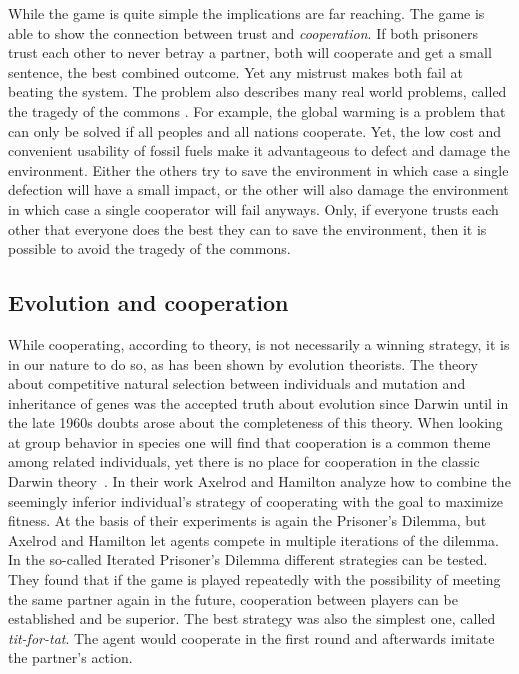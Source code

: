 While the game is quite simple the implications are far reaching. The game is able to show the 
connection between trust and \textit{cooperation}. If both prisoners trust each other to never betray a 
partner, both will cooperate and get a small sentence, the best combined outcome. Yet any mistrust
makes both fail at beating the system. The problem also describes many real world problems, called 
the tragedy of the commons \cite{Hardin1243}. For example, the global warming is a problem that can only be solved if
all peoples and all nations cooperate. Yet, the low cost and convenient usability of fossil fuels 
make it advantageous to defect and damage the environment. Either the others try to save the environment
in which case a single defection will have a small impact, or the other will also damage the environment
in which case a single cooperator will fail anyways. Only, if everyone trusts each other that
everyone does the best they can to save the environment, then it is possible to avoid the tragedy 
of the commons.

\subsection{Evolution and cooperation}
\label{sec:evolution}
While cooperating, according to theory, is not necessarily a winning strategy, it is in our nature 
to do so, as has been shown by evolution theorists. The theory about competitive natural selection 
between individuals and mutation and inheritance of genes was the accepted truth about evolution 
since Darwin until in the late 1960s doubts arose about the completeness of this 
theory. When looking at group behavior in species one will find that cooperation is a common theme
among related individuals, yet there is no place for cooperation in the classic Darwin 
theory~\cite{Axelrod1390}. In their work Axelrod and Hamilton \cite{Axelrod1390} 
analyze how to combine the seemingly inferior individual's strategy of cooperating with the goal to 
maximize fitness. At the basis of their experiments is again the Prisoner's 
Dilemma, but Axelrod and Hamilton let agents compete in multiple iterations of the dilemma. In the so-called Iterated Prisoner's Dilemma different
strategies can be tested. They found that if the game is played repeatedly with the possibility of 
meeting the same partner again in the future, cooperation between players can be established and be
superior. The best strategy was also the simplest one, called \textit{tit-for-tat}. The agent would cooperate
in the first round and afterwards imitate the partner's action.

